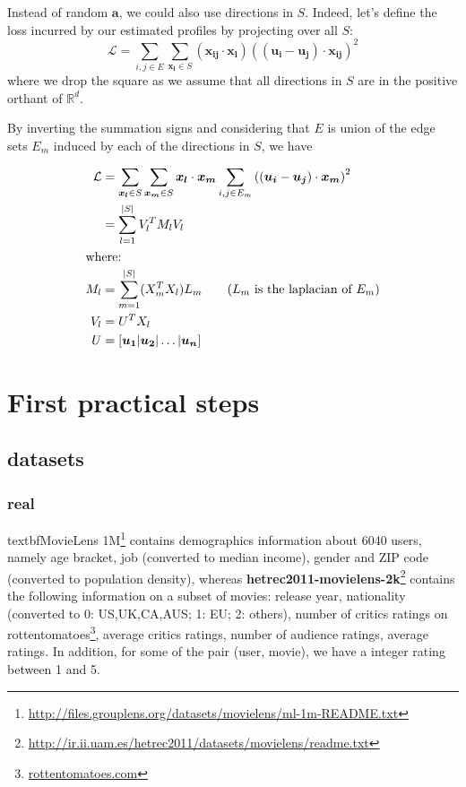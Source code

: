 Instead of random $\bm{a}$, we could also use directions in $S$. Indeed, let's
define the loss incurred by our estimated profiles by projecting over all $S$:
\begin{equation*}
	\mathcal{L} = \sum_{i,j \in E} \sum_{\bm{x_l} \in S}
	(\bm{x_{ij}}\cdot \bm{x_l}) \left( (\bm{u_i} - \bm{u_j} ) \cdot \bm{x_{ij}} \right )^2
\end{equation*}
where we drop the square as we assume that all directions in $S$ are in the
positive orthant of $\mathbb{R}^d$.

By inverting the summation signs and considering that $E$ is union of the edge
sets $E_m$ induced by each of the directions in $S$, we have

\begin{align*}
	\mathcal{L}        & = \sum_{\bm{x_l} \in S} \sum_{\bm{x_m} \in S} \bm{x_l}\cdot\bm{x_m}
	\sum_{i,j \in E_m} \left( (\bm{u_i} - \bm{u_j} ) \cdot \bm{x_m} \right )^2 \\
                       & = \sum_{l=1}^{|S|} V_l^T M_l V_l \\
	\shortintertext{where:}
	M_l                & = \sum_{m=1}^{|S|} (X_m^T X_l) L_m
	\tag{$L_m$ is the laplacian of $E_m$} \\
	V_l                & = U^T X_l \\
	U                  & = [\bm{u_1} | \bm{u_2} | \ldots | \bm{u_n} ]
\end{align*}

\section{First practical steps}


\subsection{datasets}

\subsubsection{real}

textbf{MovieLens 1M}\footnote{%
\href{http://files.grouplens.org/datasets/movielens/ml-1m-README.txt}%
{http://files.grouplens.org/datasets/movielens/ml-1m-README.txt}} contains
demographics information about 6040 users, namely age bracket, job (converted
to median income), gender and ZIP code (converted to population density),
whereas \textbf{hetrec2011-movielens-2k}\footnote{%
\href{http://ir.ii.uam.es/hetrec2011/datasets/movielens/readme.txt}%
{http://ir.ii.uam.es/hetrec2011/datasets/movielens/readme.txt}} contains the
following information on a subset of movies: release year, nationality
(converted to 0: US,UK,CA,AUS; 1: EU; 2: others), number of critics ratings on
rottentomatoes\footnote{\href{http://www.rottentomatoes.com/}{rottentomatoes.com}},
average critics ratings, number of audience ratings, average ratings. In
addition, for some of the pair (user, movie), we have a integer rating between
1 and 5.

